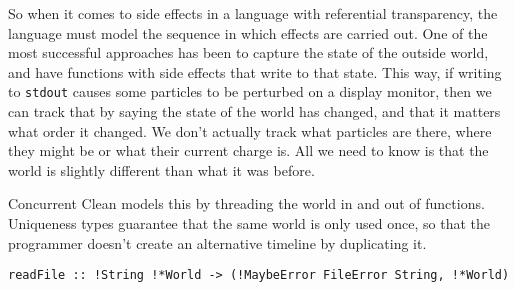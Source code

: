 \documentclass{report}
\begin{document}
So when it comes to side effects in a language with referential transparency,
the language must model the sequence in which effects are carried out. One of
the most successful approaches has been to capture the state of the outside
world, and have functions with side effects that write to that state. This
way, if writing to \texttt{stdout} causes some particles to be perturbed on a
display monitor, then we can track that by saying the state of the world has
changed, and that it matters what order it changed. We don't actually track
what particles are there, where they might be or what their current charge
is. All we need to know is that the world is slightly different than what it
was before.

Concurrent Clean models this by threading the world in and out of
functions. Uniqueness types guarantee that the same world is only used once, so
that the programmer doesn't create an alternative timeline by duplicating it.
\begin{verbatim}
readFile :: !String !*World -> (!MaybeError FileError String, !*World)
\end{verbatim}
\end{document}
